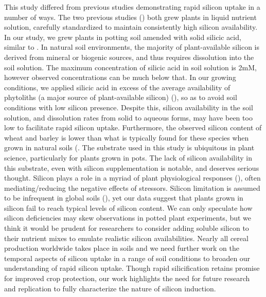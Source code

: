 \documentclass[12pt, letterpaper, ]{report}
\begin{document}
This study differed from previous studies demonstrating rapid silicon uptake in a number of ways. The two previous studies (\cite{waterman_short-term_2021-1,waterman_short-term_2021}) both grew plants in liquid nutrient solution, carefully standardized to maintain consistently high silicon availability. In our study, we grew plants in potting soil amended with solid silicic acid, similar to \textcite{nascimento_silicon_2019}. In natural soil environments, the majority of plant-available silicon is derived from mineral or biogenic sources, and thus requires dissolution into the soil solution. The maximum concentration of silicic acid in soil solution is 2mM, however observed concentrations can be much below that. In our growing conditions, we applied silicic acid in excess of the average availability of phytoliths (a major source of plant-available silicon) (\cite{de_tombeur_plants_2020}), so as to avoid soil conditions with low silicon presence. Despite this, silicon availability in the soil solution, and dissolution rates from solid to aqueous forms, may have been too low to facilitate rapid silicon uptake. Furthermore, the observed silicon content of wheat and barley is lower than what is typically found for these species when grown in natural soils (\cite{simpson_still_2017,parr_phytolith_2011}. The substrate used in this study is ubiquitous in plant science, particularly for plants grown in pots. The lack of silicon availability in this substrate, even with silicon supplementation is notable, and deserves serious thought. Silicon plays a role in a myriad of plant physiological responses (\cite{coskun_controversies_2019}), often mediating/reducing the negative effects of stressors. Silicon limitation is assumed to be infrequent in global soils (\cite{guntzer_benefits_2012}), yet our data suggest that plants grown in silicon fail to reach typical levels of silicon content. We can only speculate how silicon deficiencies may skew observations in potted plant experiments, but we think it would be prudent for researchers to consider adding soluble silicon to their nutrient mixes to emulate realistic silicon availabilities. Nearly all cereal production worldwide takes place in soils and we need further work on the temporal aspects of silicon uptake in a range of soil conditions to broaden our understanding of rapid silicon uptake. Though rapid silicification retains promise for improved crop protection, our work highlights the need for future research and replication to fully characterize the nature of silicon induction. 
\end{document}
